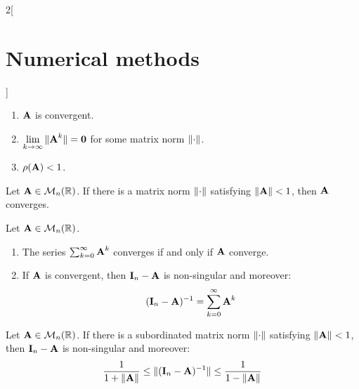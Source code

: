 \documentclass[../../../main_math.tex]{subfiles}
\begin{document}
\begin{multicols}{2}[\section{Numerical methods}]
\begin{theorem}
\begin{enumerate}
      \item $\boldsymbol{\mathrm{A}}$ is convergent.
      \item $\displaystyle\lim_{k\to\infty}\|\boldsymbol{\mathrm{A}}^k\|=\boldsymbol{\mathrm{0}}$ for some matrix norm $\left\|\cdot\right\|$.
      \item $\rho(\boldsymbol{\mathrm{A}})<1$.
    \end{enumerate}
  \end{theorem}
  \begin{corollary}
    Let $\boldsymbol{\mathrm{A}}\in\mathcal{M}_n(\mathbb{R})$. If there is a matrix norm $\left\|\cdot\right\|$ satisfying $\left\|\boldsymbol{\mathrm{A}}\right\|<1$, then $\boldsymbol{\mathrm{A}}$ converges.
  \end{corollary}
  \begin{theorem}\label{NM:A-I_sum}
    Let $\boldsymbol{\mathrm{A}}\in\mathcal{M}_n(\mathbb{R})$.
    \begin{enumerate}
      \item The series $\sum_{k=0}^\infty \boldsymbol{\mathrm{A}}^k$ converges if and only if $\boldsymbol{\mathrm{A}}$ converge.
      \item If $\boldsymbol{\mathrm{A}}$ is convergent, then $\boldsymbol{\mathrm{I}}_n-\boldsymbol{\mathrm{A}}$ is non-singular and moreover: $$(\boldsymbol{\mathrm{I}}_n-\boldsymbol{\mathrm{A}})^{-1}=\sum_{k=0}^\infty\boldsymbol{\mathrm{A}}^k$$
    \end{enumerate}
  \end{theorem}
  \begin{corollary}
    Let $\boldsymbol{\mathrm{A}}\in\mathcal{M}_n(\mathbb{R})$. If there is a subordinated matrix norm $\left\|\cdot\right\|$ satisfying $\left\|\boldsymbol{\mathrm{A}}\right\|<1$, then $\boldsymbol{\mathrm{I}}_n-\boldsymbol{\mathrm{A}}$ is non-singular and moreover: $$\frac{1}{1+\left\|\boldsymbol{\mathrm{A}}\right\|}\leq\|(\boldsymbol{\mathrm{I}}_n-\boldsymbol{\mathrm{A}})^{-1}\|\leq\frac{1}{1-\left\|\boldsymbol{\mathrm{A}}\right\|}$$
  \end{corollary}

\end{multicols}
\end{document}
